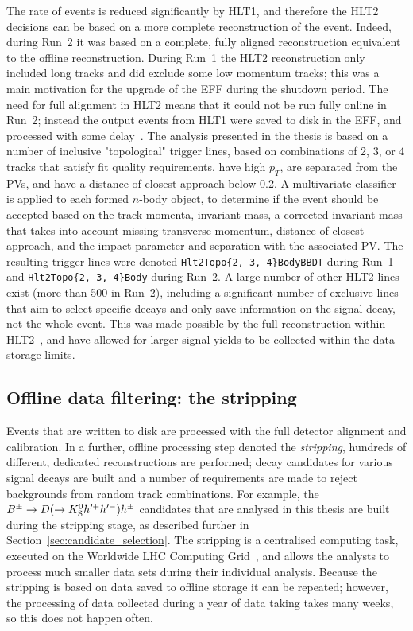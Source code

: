 The rate of events is reduced significantly by HLT1, and therefore the HLT2 decisions can be based on a more complete reconstruction of the event. Indeed, during Run~2 it was based on a complete, fully aligned reconstruction equivalent to the offline reconstruction. During Run~1 the HLT2 reconstruction only included long tracks and did exclude some low momentum tracks; this was a main motivation for the upgrade of the EFF during the shutdown period. The need for full alignment in HLT2 means that it could not be run fully online in Run~2; instead the output events from HLT1 were saved to disk in the EFF, and processed with some delay~\cite{Trigger-Performance2}. The analysis presented in the thesis is based on a number of inclusive "topological" trigger lines, based on combinations of 2, 3, or 4 tracks that satisfy fit quality requirements, have high $p_T$, are separated from the PVs, and have a distance-of-closest-approach below 0.2\mm. A multivariate classifier~\cite{gligorovEfficientReliableFast2013} is applied to each formed $n$-body object, to determine if the event should be accepted based on the track momenta, invariant mass, a corrected invariant mass that takes into account missing transverse momentum, distance of closest approach, and the impact parameter and separation with the associated PV. The resulting trigger lines were denoted \texttt{Hlt2Topo\{2, 3, 4\}BodyBBDT} during Run~1 and \texttt{Hlt2Topo\{2, 3, 4\}Body} during Run~2.  A large number of other HLT2 lines exist (more than 500 in Run~2), including a significant number of exclusive lines that aim to select specific decays and only save information on the signal decay, not the whole event. This was made possible by the full reconstruction within HLT2~\cite{Trigger-Performance2}, and have allowed for larger signal yields to be collected within the data storage limits.


\subsection{Offline data filtering: the \lhcb stripping} %
\label{sub:offline_data_filtering_the_lhcb_stripping}

Events that are written to disk are processed with the full detector alignment and calibration. In a further, offline processing step denoted the \emph{stripping}, hundreds of different, dedicated reconstructions are performed; decay candidates for various signal decays are built and a number of requirements are made to reject backgrounds from random track combinations. For example, the ${{B}^\pm}\rightarrow{\ensuremath{D}}(\rightarrow{\ensuremath{{K}^0_{\mathrm{S}}}} h'^+h'^-)h^\pm$ candidates that are analysed in this thesis are built during the stripping stage, as described further in Section~\ref{sec:candidate_selection}. The stripping is a centralised computing task, executed on the Worldwide LHC Computing Grid~\cite{birdComputingLargeHadron2011a}, and allows the analysts to process much smaller data sets during their individual analysis. Because the stripping is based on data saved to offline storage it can be repeated; however, the processing of data collected during a year of data taking takes many weeks, so this does not happen often.

